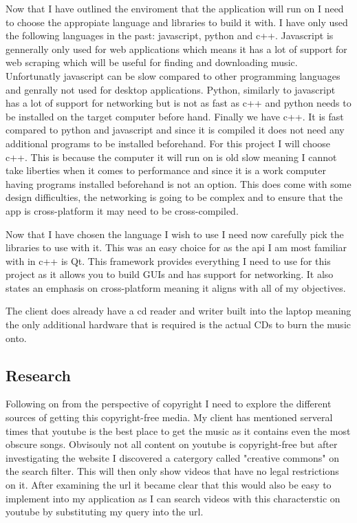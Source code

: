 \documentclass{article}
\begin{document}
Now that I have outlined the enviroment that the application will run on I need to choose
the appropiate language and libraries to build it with. I have only used the following
languages in the past: javascript, python and c++. Javascript is gennerally only used
for web applications which means it has a lot of support for web scraping which will
be useful for finding and downloading music. Unfortunatly javascript can be slow
compared to other programming languages and genrally not used for desktop applications.
Python, similarly to javascript has a lot of support for networking but is not as fast
as c++ and python needs to be installed on the target computer before hand. Finally
we have c++. It is fast compared to python and javascript and since it is compiled
it does not need any additional programs to be installed beforehand. For this project
I will choose c++. This is because the computer it will run on is old slow meaning I
cannot take liberties when it comes to performance and since it is a work computer
having programs installed beforehand is not an option. This does come with some
design difficulties, the networking is going to be complex and to ensure that
the app is cross-platform it may need to be cross-compiled.

Now that I have chosen the language I wish to use I need now carefully pick
the libraries to use with it. This was an easy choice for as the api I am
most familiar with in c++ is Qt. This framework provides everything I need
to use for this project as it allows you to build GUIs and has support for networking.
It also states an emphasis on cross-platform meaning it aligns with all of my
objectives.

The client does already have a cd reader and writer built into the laptop meaning the only
additional hardware that is required is the actual CDs to burn the music onto.
\subsection{Research}\label{research}
Following on from the perspective of copyright I need to explore the different
sources of getting this copyright-free media. My client has mentioned serveral
times that youtube is the best place to get the music as it contains even
the most obscure songs. Obvisouly not all content on youtube is copyright-free
but after investigating the website I discovered a catergory called "creative
commons" on the search filter. This will then only show videos that have no
legal restrictions on it. After examining the url it became clear that this
would also be easy to implement into my application as I can search
videos with this characterstic on youtube by substituting my query into the
url.
\end{document}
